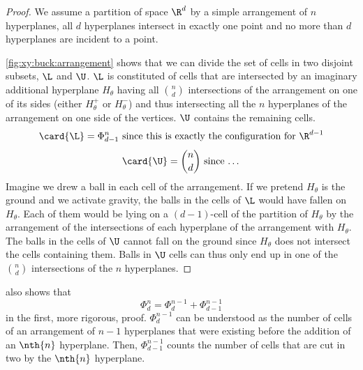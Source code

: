\begin{proof}
We assume a partition of space \(\R^d\) by a simple arrangement of \(n\)
hyperplanes, \ie all \(d\) hyperplanes intersect in exactly one point and no
more than \(d\) hyperplanes are incident to a point.

\ref{fig:xy:buck:arrangement} shows that we can divide the set of cells in two
disjoint subsets, \(\L\) and \(\U\). \(\L\) is constituted of cells that are
intersected by an imaginary additional hyperplane \(H_{\theta}\) having all
\(\binom{n}{d}\) intersections of the arrangement on one of its sides (either
\(H_{\theta}^{+}\) or \(H_{\theta}^{-}\)) and thus intersecting all the \(n\)
hyperplanes of the arrangement on one side of the vertices. \(\U\) contains the
remaining cells.
\begin{displaymath}
\card{\L} = \Phi_{d-1}^n \text{ since this is exactly the configuration for } \R^{d-1}
\end{displaymath}
\begin{displaymath}
\card{\U} = \binom{n}{d} \text{ since \dots}
\end{displaymath}
Imagine we drew a ball in each cell of the arrangement. If we pretend
\(H_{\theta}\) is the ground and we activate gravity, the balls in the cells of
\(\L\) would have fallen on \(H_{\theta}\). Each of them would be lying on a
\((d-1)\)-cell of the partition of \(H_{\theta}\) by the arrangement of the
intersections of each hyperplane of the arrangement with \(H_{\theta}\). The
balls in the cells of \(\U\) cannot fall on the ground since \(H_{\theta}\)
does not intersect the cells containing them. Balls in \(\U\) cells can thus
only end up in one of the \(\binom{n}{d}\) intersections of the \(n\)
hyperplanes.
\end{proof}

\citet*{matousek:2002} also shows that
\begin{displaymath}
\Phi_d^n = \Phi_d^{n-1} + \Phi_{d-1}^{n-1}
\end{displaymath}
in the first, more rigorous, proof. \(\Phi_d^{n-1}\) can be understood as the
number of cells of an arrangement of \(n-1\) hyperplanes that were existing
before the addition of an \(\nth{n}\) hyperplane. Then, \(\Phi_{d-1}^{n-1}\)
counts the number of cells that are cut in two by the \(\nth{n}\) hyperplane.

